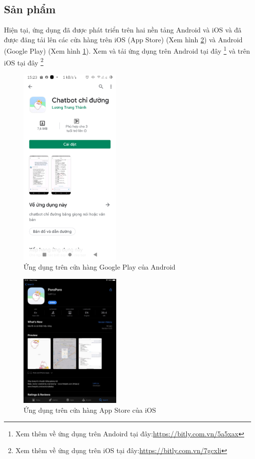 \subsection{Sản phẩm}
Hiện tại, ứng dụng đã được phát triển trên hai nền tảng Android và iOS và đã được đăng tải lên các cửa hàng trên iOS (App Store) (Xem hình \ref{fig:app-store}) và Android (Google Play) (Xem hình \ref{fig:google-play}). Xem và tải ứng dụng trên Android tại đây \footnote{Xem thêm về ứng dụng trên Andoird tại đây:\url{https://bitly.com.vn/5a5xax}} và trên iOS tại đây \footnote{Xem thêm về ứng dụng trên iOS tại đây:\url{https://bitly.com.vn/7gcxli}}

\begin{figure}[H]
    \centering
    \includegraphics[width=5cm]{images/GooglePlay.jpg}
    \caption{Ứng dụng trên cửa hàng Google Play của Android}
    \label{fig:google-play}
\end{figure}

\begin{figure}[H]
    \centering
    \includegraphics[width=5cm]{images/AppStore.jpg}
    \caption{Ứng dụng trên cửa hàng App Store của iOS}
    \label{fig:app-store}
\end{figure}

